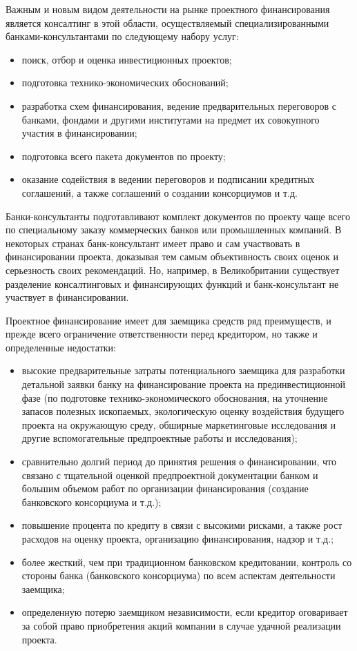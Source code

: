 Важным и новым видом деятельности на рынке проектного финансирования является консалтинг в этой области, осуществляемый специализированными банками-консультантами по следующему набору услуг:
\begin{itemize}
	\item поиск, отбор и оценка инвестиционных проектов;
	\item подготовка технико-экономических обоснований;
	\item разработка схем финансирования, ведение предварительных переговоров с банками, фондами и другими институтами на предмет их совокупного участия в финансировании;
	\item подготовка всего пакета документов по проекту;
	\item оказание содействия в ведении переговоров и подписании кредитных соглашений, а также соглашений о создании консорциумов и т.д.
\end{itemize}

Банки-консультанты подготавливают комплект документов по проекту чаще всего по специальному заказу коммерческих банков или промышленных компаний.
В некоторых странах банк-консультант имеет право и сам участвовать в финансировании проекта, доказывая тем самым объективность своих оценок и серьезность своих рекомендаций.
Но, например, в Великобритании существует разделение консалтинговых и финансирующих функций и банк-консультант не участвует в финансировании.

Проектное финансирование имеет для заемщика средств ряд преимуществ, и прежде всего ограничение ответственности перед кредитором, но также и определенные недостатки:
\begin{itemize}
	\item высокие предварительные затраты потенциального заемщика для разработки детальной заявки банку на финансирование проекта на прединвестиционной фазе (по подготовке технико-экономического обоснования, на уточнение запасов полезных ископаемых, экологическую оценку воздействия будущего проекта на окружающую среду, обширные маркетинговые исследования и другие вспомогательные предпроектные работы и исследования);
	\item сравнительно долгий период до принятия решения о финансировании, что связано с тщательной оценкой предпроектной документации банком и большим объемом работ по организации финансирования (создание банковского консорциума и т.д.);
	\item повышение процента по кредиту в связи с высокими рисками, а также рост расходов на оценку проекта, организацию финансирования, надзор и т.д.;
	\item более жесткий, чем при традиционном банковском кредитовании, контроль со стороны банка (банковского консорциума) по всем аспектам деятельности заемщика;
	\item определенную потерю заемщиком независимости, если кредитор оговаривает за собой право приобретения акций компании в случае удачной реализации проекта.
\end{itemize}

